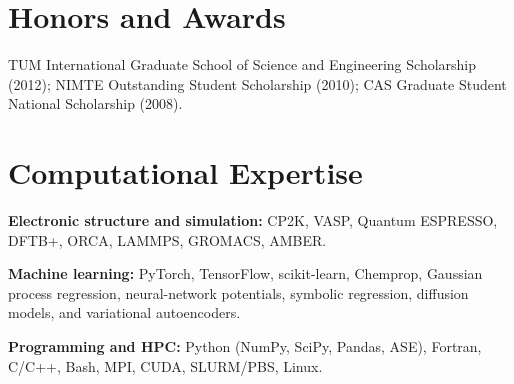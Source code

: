 \documentclass[10pt]{article}
\begin{document}
\section{Honors and Awards}

TUM International Graduate School of Science and Engineering Scholarship (2012); NIMTE Outstanding
Student Scholarship (2010); CAS Graduate Student National Scholarship (2008).

\section{Computational Expertise}

\textbf{Electronic structure and simulation:} CP2K, VASP, Quantum ESPRESSO, DFTB+, ORCA, LAMMPS,
GROMACS, AMBER.\par\vspace{2pt}
\textbf{Machine learning:} PyTorch, TensorFlow, scikit-learn, Chemprop, Gaussian process regression,
neural-network potentials, symbolic regression, diffusion models, and variational
autoencoders.\par\vspace{2pt}
\textbf{Programming and HPC:} Python (NumPy, SciPy, Pandas, ASE), Fortran, C/C++, Bash, MPI, CUDA,
SLURM/PBS, Linux.
\end{document}
